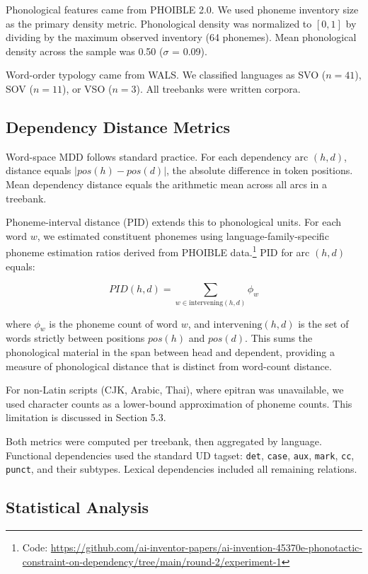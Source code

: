 \documentclass[11pt,letterpaper]{article}
\begin{document}
Phonological features came from PHOIBLE 2.0. We used phoneme inventory size as the primary density metric. Phonological density was normalized to $[0, 1]$ by dividing by the maximum observed inventory (64 phonemes). Mean phonological density across the sample was 0.50 ($\sigma$ = 0.09).

Word-order typology came from WALS. We classified languages as SVO ($n = 41$), SOV ($n = 11$), or VSO ($n = 3$). All treebanks were written corpora.

\subsection{Dependency Distance Metrics}

Word-space MDD follows standard practice. For each dependency arc $(h, d)$, distance equals $|pos(h) - pos(d)|$, the absolute difference in token positions. Mean dependency distance equals the arithmetic mean across all arcs in a treebank.

Phoneme-interval distance (PID) extends this to phonological units. For each word $w$, we estimated constituent phonemes using language-family-specific phoneme estimation ratios derived from PHOIBLE data.\footnote{Code: \url{https://github.com/ai-inventor-papers/ai-invention-45370e-phonotactic-constraint-on-dependency/tree/main/round-2/experiment-1}} PID for arc $(h, d)$ equals:

\begin{equation}
PID(h, d) = \sum_{w \in \text{intervening}(h, d)} \phi_w
\end{equation}

where $\phi_w$ is the phoneme count of word $w$, and $\text{intervening}(h, d)$ is the set of words strictly between positions $pos(h)$ and $pos(d)$. This sums the phonological material in the span between head and dependent, providing a measure of phonological distance that is distinct from word-count distance.

For non-Latin scripts (CJK, Arabic, Thai), where epitran was unavailable, we used character counts as a lower-bound approximation of phoneme counts. This limitation is discussed in Section 5.3.

Both metrics were computed per treebank, then aggregated by language. Functional dependencies used the standard UD tagset: \texttt{det}, \texttt{case}, \texttt{aux}, \texttt{mark}, \texttt{cc}, \texttt{punct}, and their subtypes. Lexical dependencies included all remaining relations.

\subsection{Statistical Analysis}
\end{document}
